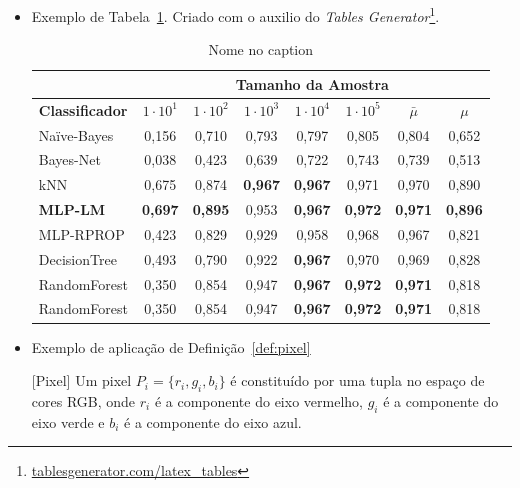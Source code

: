 \begin{itemize}
    \item Exemplo de Tabela~\ref{tab:classifiersCKC}. Criado com o auxilio do \textit{Tables Generator}\footnote{\url{tablesgenerator.com/latex_tables}}.
    \begin{table}[!htp]
\centering
\caption[Nome na lista]{Nome no caption}
\label{tab:classifiersCKC}
\begin{tabular}{l|c|c|c|c|c||c|c} \hline \hline
 & 
\multicolumn{7}{c}{ {\cellcolor[HTML]{68CBD0}\textbf{Tamanho da Amostra}} }    \\ \hline
\cellcolor[HTML]{68CBD0} \textbf{Classificador} & 
\cellcolor[HTML]{68CBD0} \textbf{$1 \cdot 10^1$}  & 
\cellcolor[HTML]{68CBD0} \textbf{$1 \cdot 10^2$}  & 
\cellcolor[HTML]{68CBD0} \textbf{$1 \cdot 10^3$}  & 
\cellcolor[HTML]{68CBD0} \textbf{$1 \cdot 10^4$}  & 
\cellcolor[HTML]{68CBD0} \textbf{$1 \cdot 10^5$}  &
\cellcolor[HTML]{68CBD0} \textbf{$\bar{\mu}$} &
\cellcolor[HTML]{68CBD0} \textbf{$\mu$}\\ \hline \hline
Na\"ive-Bayes         & 0,156 & 0,710 & 0,793 & 0,797 & 0,805  & 0,804 & 0,652 \\ \hline
Bayes-Net         & 0,038 & 0,423 & 0,639 & 0,722 & 0,743  & 0,739 & 0,513 \\ \hline
kNN        & 0,675 & 0,874 & \textbf{0,967} & \textbf{0,967} & 0,971 & 0,970 & 0,890\\ \hline
\textbf{MLP-LM} & \textbf{0,697} & \textbf{0,895} & 0,953 & \textbf{0,967} & \textbf{0,972} & \textbf{0,971} & \textbf{0,896} \\ \hline
MLP-RPROP     & 0,423 & 0,829 & 0,929 & 0,958 & 0,968  & 0,967 & 0,821 \\ \hline
DecisionTree         & 0,493 & 0,790 & 0,922 & \textbf{0,967} & 0,970  & 0,969 & 0,828 \\ \hline
RandomForest         & 0,350 & 0,854 & 0,947 & \textbf{0,967} & \textbf{0,972} & \textbf{0,971} & 0,818\\ \hline 
RandomForest         & 0,350 & 0,854 & 0,947 & \textbf{0,967} & \textbf{0,972} & \textbf{0,971} & 0,818\\ \hline \hline

\end{tabular}
\end{table}
    
    \item Exemplo de aplicação de Definição~\ref{def:pixel}
    
    \begin{definition}\label{def:pixel}[Pixel] 
    Um pixel $P_i=\{r_i,g_i,b_i\} $ é constituído por uma tupla no espaço de cores RGB, onde $r_i$ é a componente do eixo vermelho, $g_i$ é a componente do eixo verde e $b_i$ é a componente do eixo azul.
    \end{definition}
    

\end{itemize}
